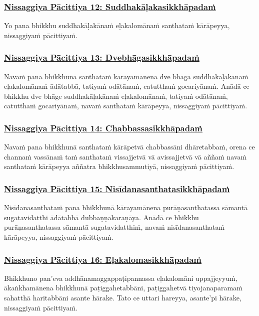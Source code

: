\subsubsection*{\hyperref[forf-exp12]{Nissaggiya Pācittiya 12: Suddhakāḷakasikkhāpadaṁ}}
\label{np12}
Yo pana bhikkhu suddhakāḷakānaṁ eḷakalomānaṁ santhataṁ kārāpeyya, nissaggiyaṁ pācittiyaṁ.

\subsubsection*{\hyperref[forf-exp13]{Nissaggiya Pācittiya 13: Dvebhāgasikkhāpadaṁ}}
\label{np13}
Navaṁ pana bhikkhunā santhataṁ kārayamānena dve bhāgā suddhakāḷakānaṁ eḷakalomānaṁ ādātabbā, tatiyaṁ odātānaṁ, catutthaṁ gocariyānaṁ. Anādā ce bhikkhu dve bhāge suddhakāḷakānaṁ eḷakalomānaṁ, tatiyaṁ odātānaṁ, catutthaṁ gocariyānaṁ, navaṁ santhataṁ kārāpeyya, nissaggiyaṁ pācittiyaṁ.

\subsubsection*{\hyperref[forf-exp14]{Nissaggiya Pācittiya 14: Chabbassasikkhāpadaṁ}}
\label{np14}
Navaṁ pana bhikkhunā santhataṁ kārāpetvā chabbassāni dhāretabbaṁ, orena ce channaṁ vassānaṁ taṁ santhataṁ vissajjetvā vā avissajjetvā vā aññaṁ navaṁ santhataṁ kārāpeyya aññatra bhikkhusammutiyā, nissaggiyaṁ pācittiyaṁ.

\subsubsection*{\hyperref[forf-exp15]{Nissaggiya Pācittiya 15: Nisīdanasanthatasikkhāpadaṁ}}
\label{np15}
Nisīdanasanthataṁ pana bhikkhunā kārayamānena purāṇasanthatassa sāmantā sugatavidatthi ādātabbā dubbaṇṇakaraṇāya. Anādā ce bhikkhu purāṇasanthatassa sāmantā sugatavidatthiṁ, navaṁ nisīdanasanthataṁ kārāpeyya, nissaggiyaṁ pācittiyaṁ.

\subsubsection*{\hyperref[forf-exp16]{Nissaggiya Pācittiya 16: Eḷakalomasikkhāpadaṁ}}
\label{np16}
Bhikkhuno pan'eva addhānamaggappaṭipannassa eḷakalomāni uppajjeyyuṁ, ākaṅkhamānena bhikkhunā paṭiggahetabbāni, paṭiggahetvā tiyojanaparamaṁ sahatthā haritabbāni asante hārake. Tato ce uttari hareyya, asante'pi hārake, nissaggiyaṁ pācittiyaṁ.

